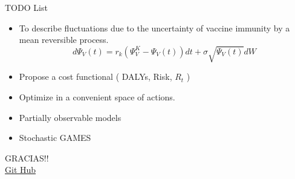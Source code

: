 \begin{frame}{TODO List}
    \begin{itemize}
        \item
            To describe fluctuations due to the uncertainty of vaccine immunity by
            a mean reversible process.
            $$
                d \Psi_V(t) =  r_k  (\Psi_V^{K} - \Psi_V(t)) dt + \sigma
                \sqrt{\Psi_V(t)} dW
            $$
        \item Propose a cost functional ( DALYs, Risk, $R_t$ )
        \item Optimize in a convenient space of actions.
        \item Partially observable models
        \item Stochastic GAMES
    \end{itemize}
\end{frame}

\begin{frame}{}
    \centering
    \Huge{GRACIAS!!}
    \\
    \normalsize
    \href{%
        https://github.com/SaulDiazInfante/
        Baemer-SIAM-Section-Mexico-third-annual-Metting.git}{
        Git Hub}
    \\
    \insertqrcode
\end{frame}